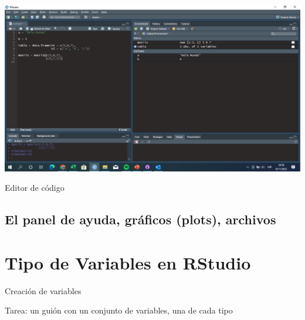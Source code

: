 \documentclass[]{tufte-handout}
\begin{document}
\begin{marginfigure}
\includegraphics[width=17.78in]{../../public/img/02 - environment} \caption[Editor de código]{Editor de código}\label{fig:unnamed-chunk-4}
\end{marginfigure}

\hypertarget{el-panel-de-ayuda-gruxe1ficos-plots-archivos}{%
\subsection{El panel de ayuda, gráficos (plots),
archivos}\label{el-panel-de-ayuda-gruxe1ficos-plots-archivos}}

\hypertarget{tipo-de-variables-en-rstudio}{%
\section{Tipo de Variables en
RStudio}\label{tipo-de-variables-en-rstudio}}

Creación de variables

Tarea: un guión con un conjunto de variables, una de cada tipo
\end{document}
